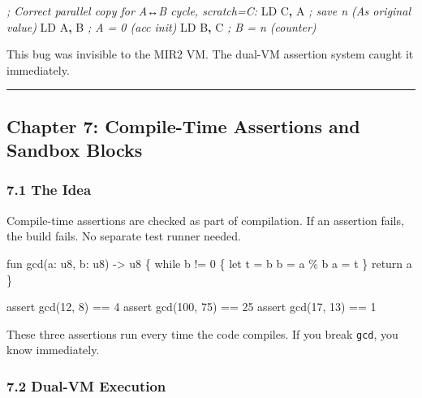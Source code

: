 \documentclass[
  11pt,
]{article}
\newenvironment{Shaded}{\begin{snugshade}}{\end{snugshade}}
\newcommand{\CommentTok}[1]{\textcolor[rgb]{0.56,0.35,0.01}{\textit{#1}}}
\newcommand{\NormalTok}[1]{#1}
\newcommand{\OperatorTok}[1]{\textcolor[rgb]{0.81,0.36,0.00}{\textbf{#1}}}
\begin{document}
\begin{Shaded}
\begin{Highlighting}[]
\CommentTok{; Correct parallel copy for A↔B cycle, scratch=C:}
\NormalTok{LD C}\OperatorTok{,}\NormalTok{ A     }\CommentTok{; save n (A\textquotesingle{}s original value)}
\NormalTok{LD A}\OperatorTok{,}\NormalTok{ B     }\CommentTok{; A = 0 (acc init)}
\NormalTok{LD B}\OperatorTok{,}\NormalTok{ C     }\CommentTok{; B = n (counter)}
\end{Highlighting}
\end{Shaded}

This bug was invisible to the MIR2 VM. The dual-VM assertion system
caught it immediately.

\begin{center}\rule{0.5\linewidth}{0.5pt}\end{center}

\hypertarget{chapter-7-compile-time-assertions-and-sandbox-blocks}{%
\subsection{Chapter 7: Compile-Time Assertions and Sandbox
Blocks}\label{chapter-7-compile-time-assertions-and-sandbox-blocks}}

\hypertarget{the-idea}{%
\subsubsection{7.1 The Idea}\label{the-idea}}

Compile-time assertions are checked as part of compilation. If an
assertion fails, the build fails. No separate test runner needed.

\begin{Shaded}
\begin{Highlighting}[]
\NormalTok{fun gcd(a: u8, b: u8) {-}\textgreater{} u8 \{}
\NormalTok{    while b != 0 \{}
\NormalTok{        let t = b}
\NormalTok{        b = a \% b}
\NormalTok{        a = t}
\NormalTok{    \}}
\NormalTok{    return a}
\NormalTok{\}}

\NormalTok{assert gcd(12, 8) == 4}
\NormalTok{assert gcd(100, 75) == 25}
\NormalTok{assert gcd(17, 13) == 1}
\end{Highlighting}
\end{Shaded}

These three assertions run every time the code compiles. If you break
\texttt{gcd}, you know immediately.

\hypertarget{dual-vm-execution}{%
\subsubsection{7.2 Dual-VM Execution}\label{dual-vm-execution}}
\end{document}
